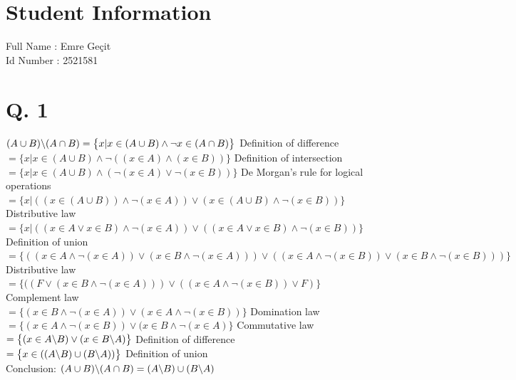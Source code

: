 \documentclass[10pt]{article}
\begin{document}
\section*{Student Information } 
Full Name :  Emre Geçit\\
Id Number :  2521581\\


\section*{Q. 1}
$(A \cup B)\symbol{92}(A \cap B)=\big\{x|x\in (A \cup B) \land \neg x\in (A \cap B) \big\}$ Definition of difference \\
$=\big\{x|x\in (A \cup B) \land \neg((x \in A) \land (x \in B)) \big\}$ Definition of intersection \\
$=\big\{x|x\in (A \cup B) \land (\neg(x \in A) \lor \neg(x \in B)) \big\}$ De Morgan's rule for logical operations \\
$=\big\{x|((x\in (A \cup B)) \land \neg(x \in A)) \lor (x \in (A \cup B)\land \neg(x \in B)) \big\}$ Distributive law \\
$=\big\{x|((x\in A \lor x\in B) \land \neg(x \in A)) \lor ((x \in A \lor x \in B)\land \neg(x \in B)) \big\}$ Definition of union \\
$=\big\{((x \in A \land \neg (x \in A)) \lor (x \in B \land \neg (x \in A))) \lor ((x \in A \land \neg (x \in B)) \lor (x \in B \land \neg (x \in B))) \big\}$ Distributive law \\
$=\big\{((F \lor (x \in B \land \neg (x \in A))) \lor ((x \in A \land \neg (x \in B)) \lor F)\big\}$ Complement law \\
$=\big\{(x \in B \land \neg (x \in A)) \lor (x \in A \land \neg (x \in B))\big\}$ Domination law \\
$=\big\{(x \in A \land \neg (x \in B)) \lor (x \in B \land \neg (x \in A)\big\}$ Commutative law \\
$=\big\{(x \in A \symbol{92} B) \lor (x \in B \symbol{92} A)\big\}$ Definition of difference \\
$=\big\{x \in ((A \symbol{92} B) \cup (B \symbol{92} A))\big\}$ Definition of union \\

Conclusion:
$(A \cup B)\symbol{92}(A \cap B)=(A \symbol{92} B) \cup (B \symbol{92} A)$
\end{document}
